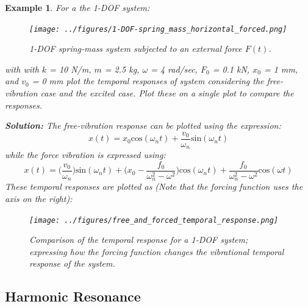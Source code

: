 \documentclass[12pt,letter]{article}
\newtheorem{ex}{Example}
\numberwithin{ex}{section} %
\newenvironment{example}{\begin{mdframed}[middlelinewidth=0.5mm]\begin{ex}\normalfont}{\end{ex}\end{mdframed}}
\numberwithin{re}{section} %
\numberwithin{pr}{section} %
\begin{document}
			\begin{example}
				For a the 1-DOF system:
				\begin{figure}[H]
					\centering
					\texttt{[image: ../figures/1-DOF-spring\_mass\_horizontal\_forced.png]}
					\caption{1-DOF spring-mass system subjected to an external force $F(t)$.}
				\end{figure}
				with with $k$ = 10 N/m, $m$ = 2.5 kg, $\omega$ = 4 rad/sec, $F_0$ = 0.1 kN, $x_0$ = 1 mm, and $v_0$ = 0 mm plot the temporal responses of system considering the free-vibration case and the excited case. Plot these on a single plot to compare the responses. 
							
				\noindent\textbf{Solution:} The free-vibration response can be plotted using the expression:
				\begin{equation}
					x(t) = x_0\text{cos}(\omega_n t) + \frac{v_0}{\omega_n}\text{sin}(\omega_n t)
				\end{equation}				
				while the force vibration is expressed using:
				\begin{equation}
					x(t) = \Big(\frac{v_0}{\omega_n}\Big)\text{sin}(\omega_n t) + \Big(x_0-\frac{f_0}{\omega_n^2-\omega^2}\Big)\text{cos}(\omega_n t) + \frac{f_0}{\omega_n^2-\omega^2}\text{cos}(\omega t)
				\end{equation}	
				These temporal responses are plotted as (Note that the forcing function uses the axis on the right):
				\begin{figure}[H]
					\centering
					\texttt{[image: ../figures/free\_and\_forced\_temporal\_response.png]}
					\caption{Comparison of the temporal response for a 1-DOF system; expressing how the forcing function changes the vibrational  temporal response of the system.}
				\end{figure}	
			\end{example}
			
			
		\subsection{Harmonic Resonance}			
			
\end{document}
